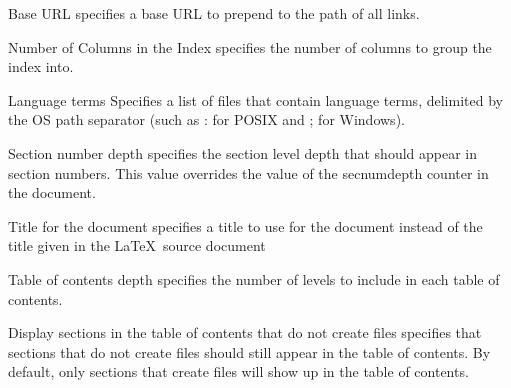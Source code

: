 \begin{configuration}{Base URL}
specifies a base URL to prepend to the path of all links.
\end{configuration}

\begin{configuration}{Number of Columns in the Index}
specifies the number of columns to group the index into.
\end{configuration}

\begin{configuration}{Language terms}
Specifies a list of files that contain language terms, delimited by the
OS path separator (such as : for POSIX and ; for Windows).
\end{configuration}

\begin{configuration}{Section number depth}
specifies the section level depth that should appear in section numbers.
This value overrides the value of the secnumdepth counter in the document.
\end{configuration}

\begin{configuration}{Title for the document}
specifies a title to use for the document instead of the title given
in the \LaTeX\ source document
\end{configuration}

\begin{configuration}{Table of contents depth}
specifies the number of levels to include in each table of contents.
\end{configuration}

\begin{configuration}{Display sections in the table of contents that do not create files}
specifies that sections that do not create files should still appear in the
table of contents.  By default, only sections that create files will show
up in the table of contents.
\end{configuration}


